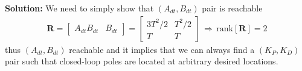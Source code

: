 \documentclass[twoside]{article}
\begin{document}
\begin{enumerate}
\textbf{Solution:} We need to simply show that $(A_{dt} , B_{dt})$ pair is reachable
%
\begin{align*}
\mathbf{R} = \left[ \begin{array}{c|c} A_{dt} B_{dt} & B_{dt} \end{array} \right] = 
\left[ \begin{array}{c|c} 3 T^2 /2 & T^2/2 \\ T & T \end{array} \right] \, \Rightarrow \, \mathrm{rank}[\mathbf{R}] = 2  
\end{align*}
%
thus $(A_{dt} , B_{dt})$ reachable and it implies that we can always find a $(K_P,K_D)$ pair such that closed-loop poles are located
at arbitrary desired locations. 

\end{enumerate}


\end{document}
